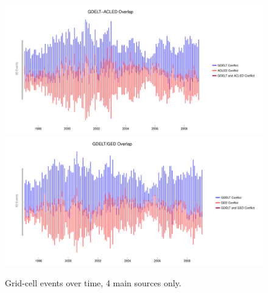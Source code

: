 \documentclass[hidelinks]{article}
\begin{document}
\begin{figure}[!htbp]
\includegraphics[width = 1 \textwidth]{timeACLED4source.pdf}\\
\includegraphics[width = 1 \textwidth]{timeGED4source.pdf}
\caption{Grid-cell events over time, 4 main sources only.}\label{fig:correlations_time}
\end{figure}
\end{document}
